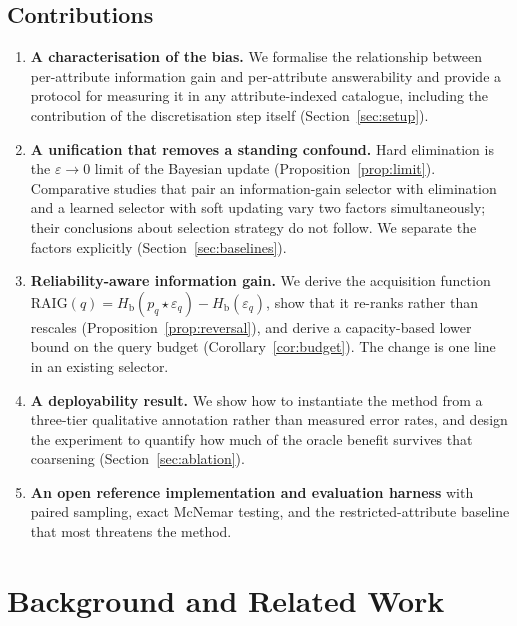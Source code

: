 \documentclass[conference]{IEEEtran}
\newcommand{\Hb}{H_{\mathrm{b}}}
\newcommand{\RAIG}{\mathrm{RAIG}}
\begin{document}
\subsection{Contributions}

\begin{enumerate}
\item \textbf{A characterisation of the bias.} We formalise the relationship
between per-attribute information gain and per-attribute answerability and
provide a protocol for measuring it in any attribute-indexed catalogue,
including the contribution of the discretisation step itself
(Section~\ref{sec:setup}).

\item \textbf{A unification that removes a standing confound.} Hard elimination
is the $\varepsilon \to 0$ limit of the Bayesian update
(Proposition~\ref{prop:limit}). Comparative studies that pair an
information-gain selector with elimination and a learned selector with soft
updating vary two factors simultaneously; their conclusions about selection
strategy do not follow. We separate the factors explicitly
(Section~\ref{sec:baselines}).

\item \textbf{Reliability-aware information gain.} We derive the acquisition
function $\RAIG(q) = \Hb(p_q \star \varepsilon_q) - \Hb(\varepsilon_q)$, show
that it re-ranks rather than rescales (Proposition~\ref{prop:reversal}), and
derive a capacity-based lower bound on the query budget
(Corollary~\ref{cor:budget}). The change is one line in an existing selector.

\item \textbf{A deployability result.} We show how to instantiate the method
from a three-tier qualitative annotation rather than measured error rates, and
design the experiment to quantify how much of the oracle benefit survives that
coarsening (Section~\ref{sec:ablation}).

\item \textbf{An open reference implementation and evaluation harness} with
paired sampling, exact McNemar testing, and the restricted-attribute baseline
that most threatens the method.
\end{enumerate}

\section{Background and Related Work}
\end{document}
